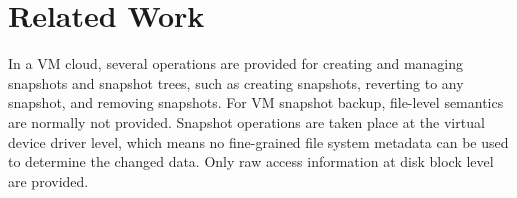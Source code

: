 \section{Related Work}
\label{inline:related}
In a VM cloud, several operations are provided for creating and managing snapshots and snapshot trees,
such as creating snapshots, reverting to any snapshot, and removing snapshots.
For VM snapshot backup, file-level semantics are normally not provided. 
Snapshot operations are taken place at the virtual device driver level, which means no fine-grained file system metadata can be used to determine the changed data. Only raw access information at disk block level are provided.




